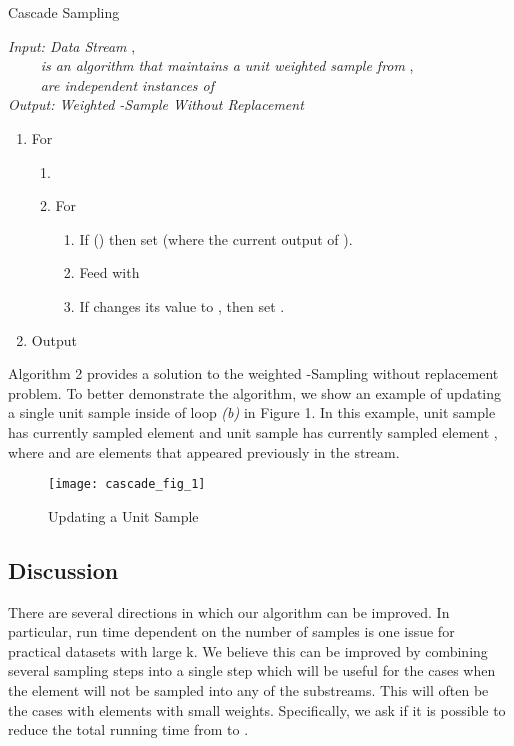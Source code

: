 \documentclass{llncs}
\begin{document}
\begin{algorithm}[H]
\caption{Cascade Sampling}

\emph{Input: Data Stream },\\
\ \ \ \ \emph{ is an algorithm that maintains a unit weighted sample from },\\
\ \ \ \ \emph{ are independent instances of }\\
\emph{Output: Weighted -Sample Without Replacement  }
\begin{enumerate}
  \item For 
  \begin{enumerate}
  \item 
  \item For 
  \begin{enumerate}
  \item If () then set   (where  the current output of ).
  \item Feed  with 
  \item If  changes its value to , then set .
  \end{enumerate}
  \end{enumerate}
  \item Output 

\end{enumerate}

\end{algorithm}

Algorithm 2 provides a solution to the weighted -Sampling without replacement problem. To better demonstrate the algorithm, we show an example of updating a single unit sample inside of loop \emph{(b)} in Figure 1. In this example, unit sample  has currently sampled element  and unit sample  has currently sampled element , where  and  are elements that appeared previously in the stream.

\begin{figure}[h]\label{pic1}
\centering
\texttt{[image: cascade\_fig\_1]}\caption{Updating a Unit Sample}
\setlength{\belowcaptionskip}{-10pt}
\clearpage
\end{figure}

\subsection{Discussion}
There are several directions in which our algorithm can be improved. In particular, run time dependent on the number of samples is one issue for practical datasets with large k. We believe this can be improved by combining several sampling steps into a single step which will be useful for the cases when the element will not be sampled into any of the substreams. This will often be the cases with elements with small weights. Specifically, we ask if it is possible to reduce the total running time from  to .
\end{document}
